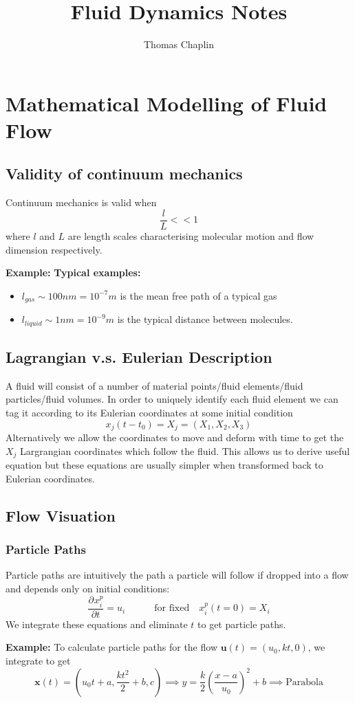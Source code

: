 \documentclass[11pt]{article}
\title{Fluid Dynamics Notes}
\author{Thomas Chaplin}
\date{}
\newcommand*{\pd}[3][]{\ensuremath{\frac{\partial^{#1} {#2}}{\partial {#3}^{#1}}}}
\newcommand{\mv}[1]{\bm{#1}}
\newenvironment{eg}
{\begin{mdframed}[backgroundcolor=mylg, roundcorner=5pt, linewidth=0pt]\textbf{Example: }\normalfont}
    {\end{mdframed}}
\begin{document}
\maketitle
\section{Mathematical Modelling of Fluid Flow}
\subsection{Validity of continuum mechanics}
Continuum mechanics is valid when
$$\frac{l}{L}<<1$$
where $l$ and $L$ are length scales characterising molecular motion and flow dimension respectively.
\begin{eg}
\textbf{Typical examples:}
\begin{itemize}
    \item $l_{gas}\sim 100nm=10^{-7}m$ is the mean free path of a typical gas
    \item $l_{liquid}\sim 1nm=10^{-9}m$ is the typical distance between molecules.
\end{itemize}
\end{eg}

\subsection{Lagrangian v.s. Eulerian Description}
A fluid will consist of a number of material points/fluid elements/fluid particles/fluid volumes.
In order to uniquely identify each fluid element we can tag it according to its Eulerian coordinates at some initial condition
$$x_j(t-t_0)=X_j=(X_1,X_2,X_3)$$
Alternatively we allow the coordinates to move and deform with time to get the $X_j$ Largrangian coordinates which follow the fluid.
This allows us to derive useful equation but these equations are usually simpler when transformed back to Eulerian coordinates.

\subsection{Flow Visuation}
\subsubsection{Particle Paths}
Particle paths are intuitively the path a particle will follow if dropped into a flow and depends only on initial conditions:
$$\pd{x_i^p}{t}=u_i \quad\quad\quad \text{for fixed} \quad x_i^p(t=0)=X_i$$
We integrate these equations and eliminate $t$ to get particle paths.
\begin{eg}
To calculate particle paths for the flow $\mv{u}(t)=(u_0,kt,0)$, we integrate to get
$$\mv{x}(t)=(u_0t+a,\frac{kt^2}{2}+b,c)\implies y=\frac{k}{2}\left(\frac{x-a}{u_0}\right)^2+b\implies\text{Parabola}$$
\end{eg}
\end{document}
